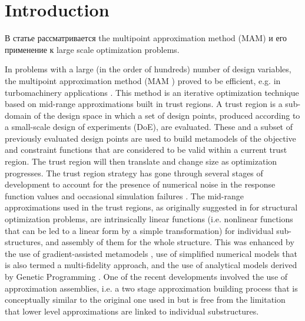 \documentclass[runningheads,a4paper]{llncs}
\begin{document}
\section{Introduction}

\Russian
В статье рассматривается the multipoint approximation method (MAM) и его применение к large scale optimization problems. 

In problems with a large (in the order of hundreds) number of design variables, the multipoint approximation method (MAM \cite{Toropov1989,Toropov1992,ToropovFilatov1993}) proved to be efficient, e.g. in turbomachinery applications \cite{ShahparPolynkinToropov2008,PolynkinToropovShahpar2008,PolynkinToropovShahpar2010} . This method is an iterative optimization technique based on mid-range approximations built in trust regions. A trust region is a sub-domain of the design space in which a set of design points, produced according to a small-scale design of experiments (DoE), are evaluated. These and a subset of previously evaluated design points are used to build metamodels of the objective and constraint functions that are considered to be valid within a current trust region. The trust region will then translate and change size as optimization progresses. The trust region strategy has gone through several stages of development to account for the presence of numerical noise in the response function values \cite{KeulenToropovMarkine1996,ToropovKeulenMarkine1996} and occasional simulation failures \cite{ToropovMarkineHolden1999}. The mid-range approximations used in the trust regions, as originally suggested in \cite{Toropov1989} for structural optimization problems, are intrinsically linear functions (i.e. nonlinear functions that can be led to a linear form by a simple transformation) for individual sub-structures, and assembly of them for the whole structure. This was enhanced by the use of gradient-assisted metamodels \cite{ToropovFilatov1993}, use of simplified numerical models that is also termed a multi-fidelity approach,\cite{ToropovMarkine1996} and the use of analytical models derived by Genetic Programming \cite{ToropovAlvarez1998}. One of the recent developments \cite{PolynkinToropov2012} involved the use of approximation assemblies, i.e. a two stage approximation building process that is conceptually similar to the original one used in \cite{Toropov1989} but is free from the limitation that lower level approximations are linked to individual substructures.
\end{document}
